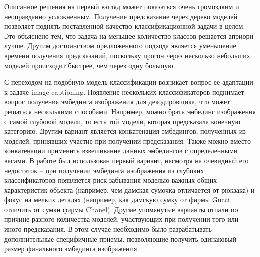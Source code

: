 \documentclass[a4paper,12pt]{extarticle}
\begin{document}
Описанное решения на первый взгляд может показаться очень громоздким и неоправданно усложненным. Получение предсказание через дерево моделей позволяет поднять поставленной качество классификационной задачи в целом. Это объяснено тем, что задача на меньшее количество классов решается априори лучше. Другим достоинством предложенного подхода является уменьшение времени получения предсказаний, поскольку прогон через несколько небольших моделей происходит быстрее, чем через одну большую.

С переходом на подобную модель классификации возникает вопрос ее адаптации к задаче image captioning. Появление нескольких классификаторов поднимает вопрос получения эмбединга изображения для декодировщика, что может решаться несколькими способами. Например, можно брать эмбединг изображения с самой глубокой модели, то есть той модели, которая предсказала конечную категорию. Другим вариант является конкатенация эмбедингов, полученных из моделей, принявших участие при получении предсказания. Также можно вместо конкатенации применить взвешивание данных эмбедингов с определенными весами. В работе был использован первый вариант, несмотря на очевидный его недостаток – при получении эмбединга изображения из глубоких классификаторов появляется риск забывания моделью важных общих характеристик объекта (например, чем дамская сумочка отличается от рюкзака) и фокус на мелких деталях (например, как дамскую сумку от фирмы Gucci отличить от сумки фирмы Chanel). Другие упомянутые варианты отпали по причине разного количества моделей, участвующих при получении того или иного предсказания. В этом случае необходимо было разрабатывать дополнительные специфичные приемы, позволяющие получить одинаковый размер финального эмбединга изображения.
\end{document}
